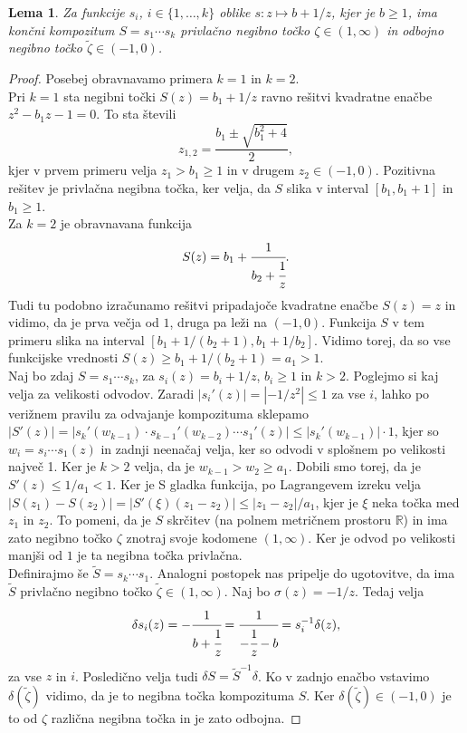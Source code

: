 \documentclass[a4paper,12pt]{article}
\def\R{\mathbb{R}} %
\newtheorem{lema}{Lema}
\newenvironment{dokaz}[1][Dokaz]{\begin{proof}}{\end{proof}}
\begin{document}
\begin{lema}
    Za funkcije $s_i$, $i \in \{1, \ldots, k\}$ oblike $s : z \mapsto b + 1/z$, kjer je $b \geq 1$, ima končni kompozitum $S = s_1 \cdots s_k$ privlačno negibno točko $\zeta \in (1, \infty)$ in odbojno negibno točko $\tilde{\zeta} \in (-1, 0)$. 
\end{lema}
\begin{dokaz}
    Posebej obravnavamo primera $k = 1$ in $k = 2$.\\
    Pri $k = 1$ sta negibni točki $S(z) = b_1 + 1 / z$ ravno rešitvi kvadratne enačbe $z^2 - b_1z - 1 = 0$. To sta števili 
    \[
        z_{1, 2} = \frac{b_1 \pm \sqrt{b_1^2+4}}{2},
    \]
    kjer v prvem primeru velja $z_1 > b_1 \geq 1$ in v drugem $z_2 \in (-1, 0)$. Pozitivna rešitev je privlačna negibna točka, ker velja, da $S$ slika v interval $[b_1, b_1 + 1]$ in $b_1 \geq 1$. \\
    Za $k = 2$ je obravnavana funkcija
    \[
        S(z) = b_1 + \cfrac{1}{b_2 + \cfrac{1}{z}}.
    \]
    Tudi tu podobno izračunamo rešitvi pripadajoče kvadratne enačbe $S(z) = z$ in vidimo, da je prva večja od $1$, druga pa leži na $(-1, 0)$. Funkcija $S$ v tem primeru slika na interval $[b_1 + 1/(b_2 + 1), b_1 + 1/b_2]$. Vidimo torej, da so vse funkcijske vrednosti $S(z) \geq b_1 + 1/(b_2 + 1) = a_1 > 1$. \\
    Naj bo zdaj $S = s_1 \cdots s_k$, za $s_i(z) = b_i + 1/z$, $b_i \geq 1$ in $k > 2$. Poglejmo si kaj velja za velikosti odvodov. Zaradi $|s_i'(z)| = |-1 / z^2| \leq 1$ za vse $i$, lahko po verižnem pravilu za odvajanje kompozituma sklepamo $|S'(z)| = |s_k'(w_{k-1})\cdot s_{k-1}'(w_{k-2})\cdots s_1'(z)| \leq |s_k'(w_{k-1})| \cdot 1$, kjer so $w_i = s_i\cdots s_1(z)$ in zadnji neenačaj velja, ker so odvodi v splošnem po velikosti največ 1. Ker je $k > 2$ velja, da je $w_{k-1} > w_2 \geq a_1$. Dobili smo torej, da je $S'(z) \leq 1/a_1 < 1$. Ker je S gladka funkcija, po Lagrangevem izreku velja $|S(z_1) - S(z_2)| = |S'(\xi)(z_1 - z_2)| \leq |z_1 - z_2| / a_1$, kjer je $\xi$ neka točka med $z_1$ in $z_2$. To pomeni, da je $S$ skrčitev (na polnem metričnem prostoru $\R$) in ima zato negibno točko $\zeta$ znotraj svoje kodomene $(1, \infty)$. Ker je odvod po velikosti manjši od $1$ je ta negibna točka privlačna. \\
    Definirajmo še $\tilde{S} = s_k \cdots s_1$. Analogni postopek nas pripelje do ugotovitve, da ima $\tilde{S}$ privlačno negibno točko $\tilde{\zeta} \in (1, \infty)$. Naj bo $\sigma(z) = -1/z$. Tedaj velja
    \[
        \delta s_i (z) = - \cfrac{1}{b + \cfrac{1}{z}} = \cfrac{1}{-\cfrac{1}{z} - b} = s^{-1}_i \delta (z),
    \]
    za vse $z$ in $i$. Posledično velja tudi $\delta S = \tilde{S}^{-1} \delta$. Ko v zadnjo enačbo vstavimo $\delta (\tilde{\zeta})$ vidimo, da je to negibna točka kompozituma $S$. Ker $\delta (\tilde{\zeta}) \in (-1, 0)$ je to od $\zeta$ različna negibna točka in je zato odbojna.
\end{dokaz}
\end{document}
